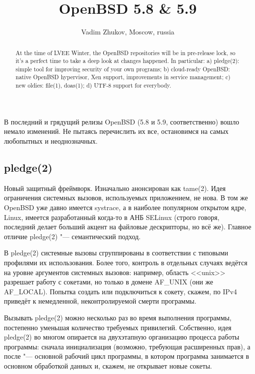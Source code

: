 \documentclass[10pt, a5paper]{article}
\begin{document}
\title{OpenBSD 5.8 & 5.9}
\author{Vadim Zhukov, Moscow, russia}
\maketitle
\begin{abstract}
At the time of LVEE Winter, the OpenBSD repositories will be in pre-release lock, so it's a perfect time to take a deep look at changes happened. In particular: a) pledge(2): simple tool for improving security of your own programs; b) cloud-ready OpenBSD: native OpenBSD hypervisor, Xen support, improvements in service management; c) new oldies: file(1), doas(1); d) UTF-8 support for everybody.
\end{abstract}

В последний и грядущий релизы OpenBSD (5.8 и 5.9, соответственно) вошло немало изменений. Не пытаясь перечислить их все, остановимся на самых любопытных и неоднозначных.

\subsection*{pledge(2)}

Новый защитный фреймворк. Изначально анонсирован как \linebreak tame(2). Идея ограничения системных вызовов, используемых приложением, не нова. В том же OpenBSD уже давно имеется systrace, а в наиболее популярном открытом ядре, Linux, имеется разработанный когда-то в АНБ SELinux (строго говоря, последний делает больший акцент на файловые дескрипторы, но всё же). Главное отличие pledge(2) "--- семантический подход.

В pledge(2) системные вызовы сгруппированы в соответствии с типовыми профилями их использования. Более того, контроль в отдельных случаях ведётся на уровне аргументов системных вызовов: например, область <<unix>> разрешает работу с сокетами, но только в домене AF\_UNIX (они же AF\_LOCAL). Попытка создать или подключиться к сокету, скажем, по IPv4 приведёт к немедленной, неконтролируемой смерти программы.

Вызывать pledge(2) можно несколько раз во время выполнения программы, постепенно уменьшая количество требуемых привилегий. Собственно, идея pledge(2) во многом опирается на двухэтапную организацию процесса работы программы: сначала инициализация (возможно, требующая расширенных прав), а после "--- основной рабочий цикл программы, в котором программа занимается в основном обработкой данных и, скажем, не открывает новые сокеты.
\end{document}
